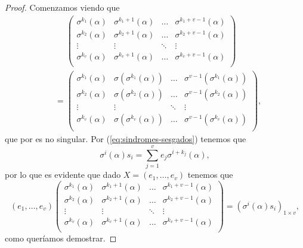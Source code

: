 \begin{proof}
  Comenzamos viendo que
  \begin{align*}
    &\phantom{={}} \begin{pmatrix}
      \sigma^{k_1}(\alpha) & \sigma^{k_1 + 1}(\alpha) & \dots & \sigma^{k_1 + v - 1}(\alpha)\\ 
      \sigma^{k_2}(\alpha) & \sigma^{k_2 + 1}(\alpha) & \dots & \sigma^{k_2 + v - 1}(\alpha)\\ 
      \vdots & \vdots & \ddots & \vdots\\ 
      \sigma^{k_v}(\alpha) & \sigma^{k_v + 1}(\alpha) & \dots & \sigma^{k_v + v - 1}(\alpha)\\ 
     \end{pmatrix}\\
     &= \begin{pmatrix}
      \sigma^{k_1}(\alpha) & \sigma(\sigma^{k_1}(\alpha)) & \dots & \sigma^{v - 1}(\sigma^{k_1}(\alpha))\\ 
      \sigma^{k_2}(\alpha) & \sigma(\sigma^{k_2}(\alpha)) & \dots & \sigma^{v - 1}(\sigma^{k_2}(\alpha))\\ 
      \vdots & \vdots & \ddots & \vdots\\ 
      \sigma^{k_v}(\alpha) & \sigma(\sigma^{k_v}(\alpha)) & \dots & \sigma^{v - 1}(\sigma^{k_v}(\alpha))\\ 
     \end{pmatrix},
  \end{align*}
  que por \parencite[Lema 2.1]{gomez-torrecillas_petersongorensteinzierler_2018} es no singular.
  Por (\ref{eq:sindromes-sesgados}) tenemos que 
  \[
    \sigma^{i}(\alpha)s_i = \sum_{j = 1}^{v}e_j\sigma^{i + k_j}(\alpha),
  \]
  por lo que es evidente que dado \(X = (e_1, \dots, e_v)\) tenemos que
  \[
    (e_1, \dots, e_v) \begin{pmatrix}
      \sigma^{k_1}(\alpha) & \sigma^{k_1 + 1}(\alpha) & \dots & \sigma^{k_1 + v - 1}(\alpha)\\ 
      \sigma^{k_2}(\alpha) & \sigma^{k_2 + 1}(\alpha) & \dots & \sigma^{k_2 + v - 1}(\alpha)\\ 
      \vdots & \vdots & \ddots & \vdots\\ 
      \sigma^{k_v}(\alpha) & \sigma^{k_v + 1}(\alpha) & \dots & \sigma^{k_v + v - 1}(\alpha)\\ 
     \end{pmatrix} = \left(\sigma^{i}(\alpha)s_i\right)_{1 \times v},
  \]
  como queríamos demostrar.
\end{proof}

